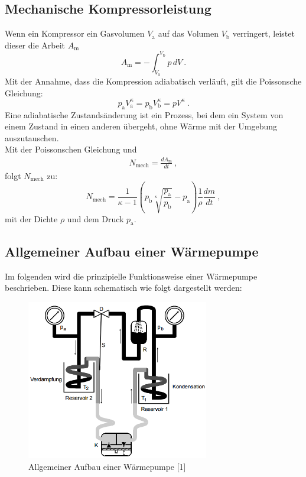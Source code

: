\subsection{Mechanische Kompressorleistung}
Wenn ein Kompressor ein Gasvolumen $V_\text{a}$ auf das Volumen $V_\text{b}$ verringert, leistet dieser die Arbeit $A_\text{m}$
\begin{equation}
	A_\text{m} = - \int_{V_\text{a}}^{V_\text{b}} p \, dV \ .
\end{equation}
Mit der Annahme, dass die Kompression adiabatisch verläuft, gilt die Poissonsche Gleichung:
\begin{equation}
	p_\text{a} V_\text{a}^\kappa = p_\text{b} V_\text{b}^\kappa = p V^\kappa \ .
\end{equation}
Eine adiabatische Zustandsänderung ist ein Prozess, bei dem ein System von einem Zustand in einen anderen übergeht, ohne Wärme mit der Umgebung auszutauschen. \\
Mit der Poissonschen Gleichung und
\begin{align*}
	N_\text{mech} = \frac{dA_\text{m}}{dt} \ ,
\end{align*}
folgt $N_\text{mech}$ zu:
\begin{equation}
	N_\text{mech} = \frac{1}{\kappa - 1} \left(p_\text{b} \sqrt[\kappa]{\frac{p_\text{a}}{p_\text{b}}} - p_\text{a} \right) \frac{1}{\rho} \frac{dm}{dt} \ ,
	\label{eqn:nmech}
\end{equation}
mit der Dichte $\rho$ und dem Druck $p_\text{a}$.

\subsection{Allgemeiner Aufbau einer Wärmepumpe}
Im folgenden wird die prinzipielle Funktionsweise einer Wärmepumpe beschrieben. Diese kann schematisch wie folgt dargestellt werden:
\begin{figure}[H]
	\centering
	\includegraphics[height=7cm]{Allgemeine_Waermepumpe.png}
	\caption{Allgemeiner Aufbau einer Wärmepumpe [1]}
\end{figure}

